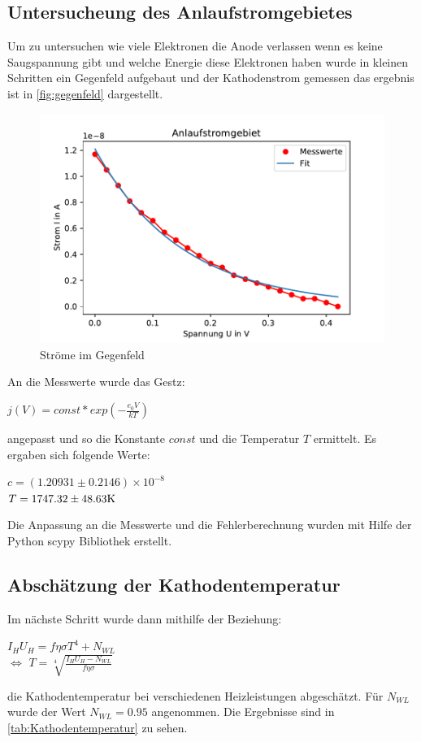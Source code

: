   \subsection{Untersucheung des Anlaufstromgebietes}
  \label{sec:anlaufstromgebiet}
  Um zu untersuchen wie viele Elektronen die Anode verlassen wenn es keine Saugspannung gibt und
  welche Energie diese Elektronen haben wurde in kleinen Schritten ein Gegenfeld aufgebaut und der Kathodenstrom 
  gemessen das ergebnis ist in \autoref{fig:gegenfeld} dargestellt.

  \begin{figure}
    \centering
    \includegraphics{anlaufstrom.pdf}
    \caption{Ströme im Gegenfeld}
    \label{fig:gegenfeld}
  \end{figure}

  An die Messwerte wurde das Gestz:
  \begin{center}
      $j(V)=const*exp(-\frac{e_0V}{kT})$
  \end{center}
  angepasst und so die Konstante $const$ und die Temperatur $T$ ermittelt. Es ergaben sich folgende Werte:
  \begin{center}
    $c=(1.20931\pm 0.2146)\times 10^{-8}$\\
    $T=1747.32\pm 48.63 \si[]{K}$
  \end{center}
  Die Anpassung an die Messwerte und die Fehlerberechnung wurden mit Hilfe der Python scypy Bibliothek erstellt.

  \subsection{Abschätzung der Kathodentemperatur}
  \label{sec:kathodentemperatur}
  Im nächste Schritt wurde dann mithilfe der Beziehung:
  \begin{center}
      $I_HU_H=f\eta \sigma T^4+N_{WL}$\\
      $\Leftrightarrow$ $T=\sqrt[4]{\frac{I_HU_H-N_{WL}}{f\eta \sigma}}$
  \end{center}
  die Kathodentemperatur bei verschiedenen Heizleistungen abgeschätzt. 
  Für $N_{WL}$ wurde der Wert $N_{WL}=0.95$ angenommen. Die Ergebnisse sind in \autoref{tab:Kathodentemperatur}
  zu sehen.

